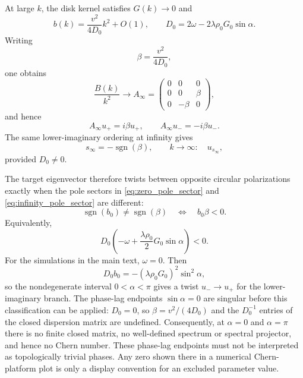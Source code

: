 \documentclass[11pt]{article}
\numberwithin{equation}{section}
\begin{document}
At large $k$, the disk kernel satisfies $\widehat G(k)\to0$ and
\begin{equation}
  b(k)=\frac{v^2}{4D_0}k^2+O(1),
  \qquad
  D_0=2\omega-2\lambda\rho_0G_0\sin\alpha .
\end{equation}
Writing
\begin{equation}
  \beta=\frac{v^2}{4D_0},
\end{equation}
one obtains
\begin{equation}
  \frac{B(k)}{k^2}\longrightarrow
  A_\infty=
  \begin{pmatrix}
  0&0&0\\
  0&0&\beta\\
  0&-\beta&0
  \end{pmatrix},
\end{equation}
and hence
\begin{equation}
  A_\infty u_+=i\beta u_+,\qquad
  A_\infty u_-=-i\beta u_- .
\end{equation}
The same lower-imaginary ordering at infinity gives
\begin{equation}
  s_\infty=-\operatorname{sgn}(\beta),
  \qquad
  k\to\infty:\quad u_{s_\infty},
  \label{eq:infinity_pole_sector}
\end{equation}
provided $D_0\ne0$.

The target eigenvector therefore twists between opposite circular
polarizations exactly when the pole sectors in
\eqref{eq:zero_pole_sector} and \eqref{eq:infinity_pole_sector}
are different:
\begin{equation}
  \operatorname{sgn}(b_0)\ne\operatorname{sgn}(\beta)
  \quad\Longleftrightarrow\quad
  b_0\beta<0 .
  \label{eq:twist_condition_beta}
\end{equation}
Equivalently,
\begin{equation}
  D_0
  \left(
  -\omega+\frac{\lambda\rho_0}{2}G_0\sin\alpha
  \right)<0 .
  \label{eq:twist_condition_general}
\end{equation}
For the simulations in the main text, $\omega=0$. Then
\begin{equation}
  D_0b_0=-(\lambda\rho_0G_0)^2\sin^2\alpha ,
\end{equation}
so the nondegenerate interval $0<\alpha<\pi$ gives a twist
$u_-\to u_+$ for the lower-imaginary branch. The phase-lag endpoints
$\sin\alpha=0$ are singular before this classification can be applied:
$D_0=0$, so $\beta=v^2/(4D_0)$ and the $D_0^{-1}$ entries of the closed
dispersion matrix are undefined. Consequently, at $\alpha=0$ and
$\alpha=\pi$ there is no finite closed matrix, no well-defined spectrum or
spectral projector, and hence no Chern number. These phase-lag endpoints must not be
interpreted as topologically trivial phases. Any zero shown there in a
numerical Chern-platform plot is only a display convention for an excluded
parameter value.
\end{document}
